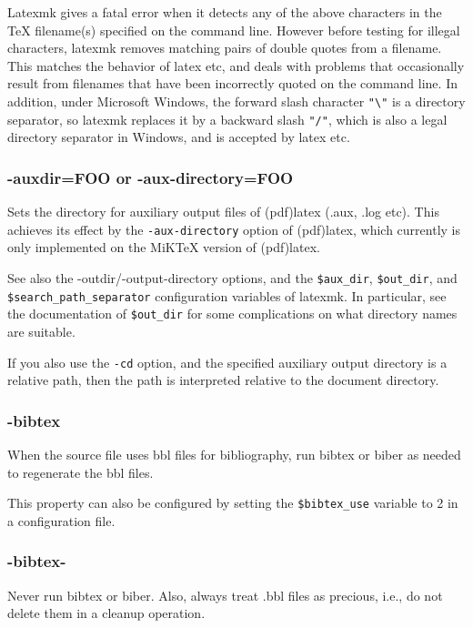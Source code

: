 Latexmk  gives  a  fatal  error when it detects any of the above characters in
the TeX filename(s) specified on the command line.  However  before  testing
for illegal characters, latexmk removes matching pairs of double quotes from a
filename.   This  matches the  behavior  of  latex  etc,  and  deals  with
problems  that occasionally result from filenames that  have  been  incorrectly
quoted  on the command line.  In addition, under Microsoft Windows, the
forward slash character \verb|"\"| is a directory  separator, so  latexmk replaces it
by a backward slash \verb|"/"|, which is also a legal directory separator in Windows,
and is accepted  by  latex etc.

\subsubsection{-auxdir=FOO or -aux-directory=FOO}

Sets  the  directory  for  auxiliary  output files of (pdf)latex
(.aux, .log etc).  This achieves its effect by  the  
\verb|-aux-directory|  option  of (pdf)latex, which currently is only implemented
on the MiKTeX version of (pdf)latex.

See  also  the  -outdir/-output-directory   options,   and   the
\verb|$aux_dir|,  \verb|$out_dir|,  and  \verb|$search_path_separator|
configuration variables of latexmk.  In particular, see the  documentation  of
\verb|$out_dir|  for  some  complications  on  what directory names are suitable.

If you also use the \verb|-cd| option, and the specified auxiliary output
directory  is a relative path, then the path is interpreted relative to the
document directory.


\subsubsection{-bibtex}

When the source file uses bbl files for bibliography, run bibtex or biber as
needed to regenerate the bbl files.

This  property can also be configured by setting the \verb|$bibtex_use| variable to 2
in a configuration file.

\subsubsection{-bibtex-}

Never run bibtex or biber.  Also, always  treat  .bbl  files  as
precious, i.e., do not delete them in a cleanup operation.

